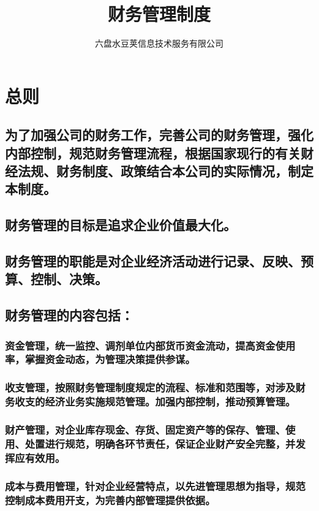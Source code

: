 \documentclass{ctexart}
\author{六盘水豆荚信息技术服务有限公司}
\date{}
\title{财务管理制度}
\begin{document}
\maketitle
\tableofcontents


\section{总则}
\label{sec-1}
\subsection{为了加强公司的财务工作，完善公司的财务管理，强化内部控制，规范财务管理流程，根据国家现行的有关财经法规、财务制度、政策结合本公司的实际情况，制定本制度。}
\label{sec-1-1}
\subsection{财务管理的目标是追求企业价值最大化。}
\label{sec-1-2}
\subsection{财务管理的职能是对企业经济活动进行记录、反映、预算、控制、决策。}
\label{sec-1-3}
\subsection{财务管理的内容包括：}
\label{sec-1-4}
\subsubsection{资金管理，统一监控、调剂单位内部货币资金流动，提高资金使用率，掌握资金动态，为管理决策提供参谋。}
\label{sec-1-4-1}
\subsubsection{收支管理，按照财务管理制度规定的流程、标准和范围等，对涉及财务收支的经济业务实施规范管理。加强内部控制，推动预算管理。}
\label{sec-1-4-2}
\subsubsection{财产管理，对企业库存现金、存货、固定资产等的保存、管理、使用、处置进行规范，明确各环节责任，保证企业财产安全完整，并发挥应有效用。}
\label{sec-1-4-3}
\subsubsection{成本与费用管理，针对企业经营特点，以先进管理思想为指导，规范控制成本费用开支，为完善内部管理提供依据。}
\label{sec-1-4-4}
\end{document}
